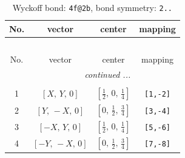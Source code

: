 \documentclass[fleqn,8pt]{jsarticle}
\begin{document}
\renewcommand{\arraystretch}{1.2}
\begin{longtable}{cccc}
\caption{Wyckoff bond: {\tt 4f@2b}, bond symmetry: {\tt 2..}}
 \\
 \hline \hline
No. & vector & center & mapping \\ \hline \endfirsthead

\multicolumn{3}{l}{\tablename\ \thetable{}} \\
 \hline \hline
No. & vector & center & mapping \\ \hline \endhead

 \hline \hline
\multicolumn{3}{r}{\footnotesize\it continued ...} \\ \endfoot

 \hline \hline
\multicolumn{3}{r}{} \\ \endlastfoot

1 & $\left[ X,\, Y,\, 0 \right]$ & $\left[ \frac{1}{2},\, 0,\, \frac{1}{4} \right]$ & {\tt [1,-2]} \\ \hline
2 & $\left[ Y,\, - X,\, 0 \right]$ & $\left[ 0,\, \frac{1}{2},\, \frac{3}{4} \right]$ & {\tt [3,-4]} \\ \hline
3 & $\left[ - X,\, Y,\, 0 \right]$ & $\left[ \frac{1}{2},\, 0,\, \frac{1}{4} \right]$ & {\tt [5,-6]} \\ \hline
4 & $\left[ - Y,\, - X,\, 0 \right]$ & $\left[ 0,\, \frac{1}{2},\, \frac{3}{4} \right]$ & {\tt [7,-8]} \\
\end{longtable}
\renewcommand{\arraystretch}{1.2}
\end{document}
